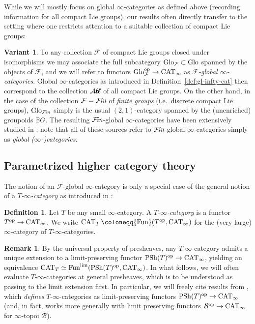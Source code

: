 \documentclass[reqno]{memo-l}
\theoremstyle{mythm}
\theoremstyle{definition}
\newtheorem{rk}[thm]{Remark}
\newtheorem{definition}[thm]{Definition}
\newtheorem{variant}[thm]{Variant}
\numberwithin{equation}{section}
\newcommand{\Aa}{{\mathcal{A}}}
\newcommand{\Bb}{{\mathcal{B}}}
\newcommand{\Ff}{{\mathcal{F}}}
\DeclareMathOperator{\CAT}{CAT}
\newcommand{\Fun}{{\textup{Fun}}}
\DeclareMathOperator{\PSh}{PSh}
\newcommand{\op}{{\textup{op}}}
\newcommand{\Fin}{\hbox{$\mathcal F\kern-1.7pt\textit{in}$}}
\newcommand{\bigAll}{\hbox{\hfuzz=20pt\hbox{$\mathcal A\kern-.3pt$}\setbox0=\hbox{$\ell\kern-.75pt\ell$}\hbox to 0pt{\hfuzz=8pt\kern-.075pt\unhcopy0}\hbox to 0pt{\hfuzz=8pt\kern.075pt\unhcopy0}\box0\kern.05pt}}
\newcommand{\smallAll}{\Aa\kern-.3pt\ell\kern-.6pt\ell}
\newcommand{\All}{\mathchoice{\bigAll}{\bigAll}{\smallAll}{\smallAll}}
\newcommand{\Glo}{\textup{Glo}}
\begin{document}
While we will mostly focus on global $\infty$-categories as defined above (recording information for all compact Lie groups), our results often directly transfer to the setting where one restricts attention to a suitable collection of compact Lie groups:

\begin{variant}
    To any collection $\Ff$ of compact Lie groups closed under isomorphisms we may associate the full subcategory $\Glo_\Ff\subset\Glo$ spanned by the objects of $\Ff$, and we will refer to functors $\Glo_\Ff^\op\to\CAT_\infty$ as \emph{$\Ff$-global $\infty$-categories}. Global $\infty$-categories as introduced in Definition~\ref{def:gl-infty-cat} then correspond to the collection $\All$ of all compact Lie groups. On the other hand, in the case of the collection $\Ff=\Fin$ of \emph{finite groups} (i.e.\ discrete compact Lie groups), $\Glo_{\Ff\!in}$ simply is the usual $(2,1)$-category spanned by the (unenriched) groupoids $\mathbb BG$. The resulting $\Fin$-global $\infty$-categories have been extensively studied in \cites{CLL_Global,CLL_Clefts,CLL_Adams,CLL_Spans,LLP}; note that all of these sources refer to $\Fin$-global $\infty$-categories simply as \emph{global \hbox{($\infty$-)}categories}.
\end{variant}

\subsection{Parametrized higher category theory} The notion of an $\Ff$-global $\infty$-category is only a special case of the general notion of a \emph{$T$-$\infty$-category} as introduced in \cite{exposeI}:

\begin{definition}\label{def:T-oo}
    Let $T$ be any small $\infty$-category. A \emph{$T$-$\infty$-category} is a functor $T^\op\to\CAT_\infty$. We write $\CAT_T\coloneqq\Fun(T^\op,\CAT_\infty)$ for the (very large) $\infty$-category of $T$-$\infty$-categories.
\end{definition}

\begin{rk}
    By the universal property of presheaves, any $T$-$\infty$-category admits a unique extension to a limit-preserving functor $\PSh(T)^\op\to\CAT_\infty$, yielding an equivalence $\CAT_T\simeq\Fun^{\text{lim}}(\PSh(T)^\op,\CAT_\infty)$. In what follows, we will often evaluate $T$-$\infty$-categories at general presheaves, which is to be understood as passing to the limit extension first. In particular, we will freely cite results from \cites{martini2021yoneda,martiniwolf2021limits,martiniwolf2022presentable}, which \emph{defines} $T$-$\infty$-categories as limit-preserving functors $\PSh(T)^\op\to\CAT_\infty$ (and, in fact, works more generally with limit preserving functors $\Bb^{\op}\to\CAT_\infty$ for $\infty$-topoi $\Bb$).
\end{rk}
\end{document}

